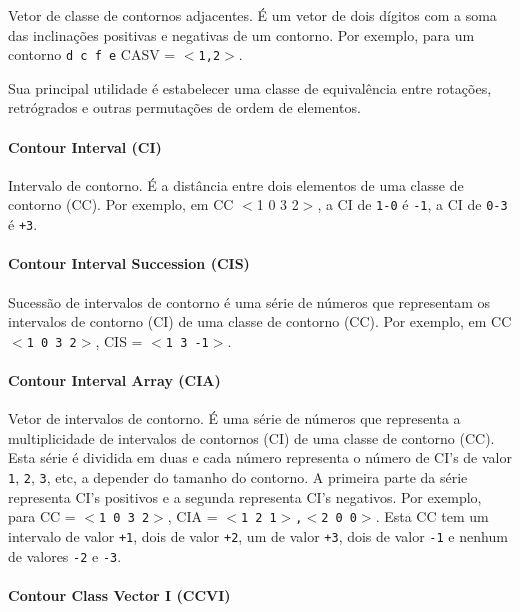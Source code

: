 \documentclass[12pt,brazil]{book}
\begin{document}
Vetor de classe de contornos adjacentes. É um vetor de dois dígitos
com a soma das inclinações positivas e negativas de um contorno. Por
exemplo, para um contorno \texttt{d c f e} CASV = \texttt{$<$1,2$>$}.

Sua principal utilidade é estabelecer uma classe de equivalência entre
rotações, retrógrados e outras permutações de ordem de elementos.

\paragraph{Contour Interval (CI)}
\label{sec:contour-interval-ci}

Intervalo de contorno. É a distância entre dois elementos de uma
classe de contorno (CC). Por exemplo, em CC $<$1 0 3 2$>$, a CI de \texttt{1-0} é
\texttt{-1}, a CI de \texttt{0-3} é \texttt{+3}.

\paragraph{Contour Interval Succession (CIS)}
\label{sec:cont-interv-succ}

Sucessão de intervalos de contorno é uma série de números que
representam os intervalos de contorno (CI) de uma classe de contorno
(CC). Por exemplo, em CC \texttt{$<$1 0 3 2$>$}, CIS = \texttt{$<$1 3 -1$>$}.

\paragraph{Contour Interval Array (CIA)}
\label{sec:cont-interv-array}

Vetor de intervalos de contorno. É uma série de números que representa
a multiplicidade de intervalos de contornos (CI) de uma classe de
contorno (CC). Esta série é dividida em duas e cada número representa
o número de CI's de valor \texttt{1}, \texttt{2}, \texttt{3}, etc, a
depender do tamanho do contorno. A primeira parte da série representa
CI's positivos e a segunda representa CI's negativos. Por exemplo,
para CC = \texttt{$<$1 0 3 2$>$}, CIA = \texttt{$<$1 2 1$>$,$<$2 0
  0$>$}. Esta CC tem um intervalo de valor \texttt{+1}, dois de valor
\texttt{+2}, um de valor \texttt{+3}, dois de valor \texttt{-1} e
nenhum de valores \texttt{-2} e \texttt{-3}.

\paragraph{Contour Class Vector I (CCVI)}
\label{sec:contour-class-vector-1}
\end{document}
